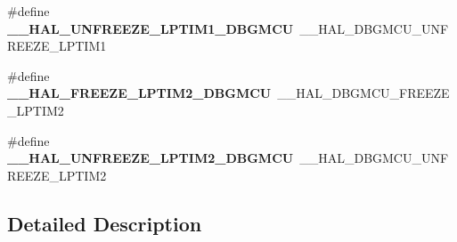 \begin{DoxyCompactItemize}
\#define {\bfseries \+\_\+\+\_\+\+H\+A\+L\+\_\+\+U\+N\+F\+R\+E\+E\+Z\+E\+\_\+\+L\+P\+T\+I\+M1\+\_\+\+D\+B\+G\+M\+CU}~\+\_\+\+\_\+\+H\+A\+L\+\_\+\+D\+B\+G\+M\+C\+U\+\_\+\+U\+N\+F\+R\+E\+E\+Z\+E\+\_\+\+L\+P\+T\+I\+M1
\item 
\mbox{\label{group___h_a_l___d_b_g_m_c_u___aliased___macros_gad0e137ee9aa05347e1ffde48f9820f34}} 
\#define {\bfseries \+\_\+\+\_\+\+H\+A\+L\+\_\+\+F\+R\+E\+E\+Z\+E\+\_\+\+L\+P\+T\+I\+M2\+\_\+\+D\+B\+G\+M\+CU}~\+\_\+\+\_\+\+H\+A\+L\+\_\+\+D\+B\+G\+M\+C\+U\+\_\+\+F\+R\+E\+E\+Z\+E\+\_\+\+L\+P\+T\+I\+M2
\item 
\mbox{\label{group___h_a_l___d_b_g_m_c_u___aliased___macros_ga7490754801ed1bcaf3e31d15757a883c}} 
\#define {\bfseries \+\_\+\+\_\+\+H\+A\+L\+\_\+\+U\+N\+F\+R\+E\+E\+Z\+E\+\_\+\+L\+P\+T\+I\+M2\+\_\+\+D\+B\+G\+M\+CU}~\+\_\+\+\_\+\+H\+A\+L\+\_\+\+D\+B\+G\+M\+C\+U\+\_\+\+U\+N\+F\+R\+E\+E\+Z\+E\+\_\+\+L\+P\+T\+I\+M2
\end{DoxyCompactItemize}


\subsection{Detailed Description}
